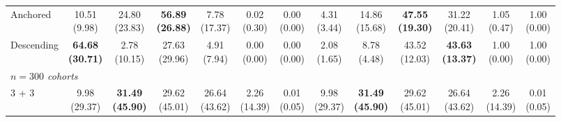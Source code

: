 {\begin{tabular}{l|cccccc|cccccc}
Anchored & \makecell{10.51 \\ (9.98)} & \makecell{24.80 \\ (23.83)} & {\cellcolor[HTML]{C8E6C9}} \bfseries \makecell{56.89 \\ (26.88)} & \makecell{7.78 \\ (17.37)} & \makecell{0.02 \\ (0.30)} & \makecell{0.00 \\ (0.00)} & \makecell{4.31 \\ (3.44)} & \makecell{14.86 \\ (15.68)} & {\cellcolor[HTML]{C8E6C9}} \bfseries \makecell{47.55 \\ (19.30)} & \makecell{31.22 \\ (20.41)} & \makecell{1.05 \\ (0.47)} & \makecell{1.00 \\ (0.00)} \\
Descending & \bfseries \makecell{64.68 \\ (30.71)} & \makecell{2.78 \\ (10.15)} & {\cellcolor[HTML]{C8E6C9}} \makecell{27.63 \\ (29.96)} & \makecell{4.91 \\ (7.94)} & \makecell{0.00 \\ (0.00)} & \makecell{0.00 \\ (0.00)} & \makecell{2.08 \\ (1.65)} & \makecell{8.78 \\ (4.48)} & {\cellcolor[HTML]{C8E6C9}} \makecell{43.52 \\ (12.03)} & \bfseries \makecell{43.63 \\ (13.37)} & \makecell{1.00 \\ (0.00)} & \makecell{1.00 \\ (0.00)} \\
\midrule
\multicolumn{13}{l}{\emph{$n = 300$ cohorts}} \\
3 + 3 & \makecell{9.98 \\ (29.37)} & \bfseries \makecell{31.49 \\ (45.90)} & {\cellcolor[HTML]{C8E6C9}} \makecell{29.62 \\ (45.01)} & \makecell{26.64 \\ (43.62)} & \makecell{2.26 \\ (14.39)} & \makecell{0.01 \\ (0.05)} & \makecell{9.98 \\ (29.37)} & \bfseries \makecell{31.49 \\ (45.90)} & {\cellcolor[HTML]{C8E6C9}} \makecell{29.62 \\ (45.01)} & \makecell{26.64 \\ (43.62)} & \makecell{2.26 \\ (14.39)} & \makecell{0.01 \\ (0.05)} \\

\end{tabular}}
